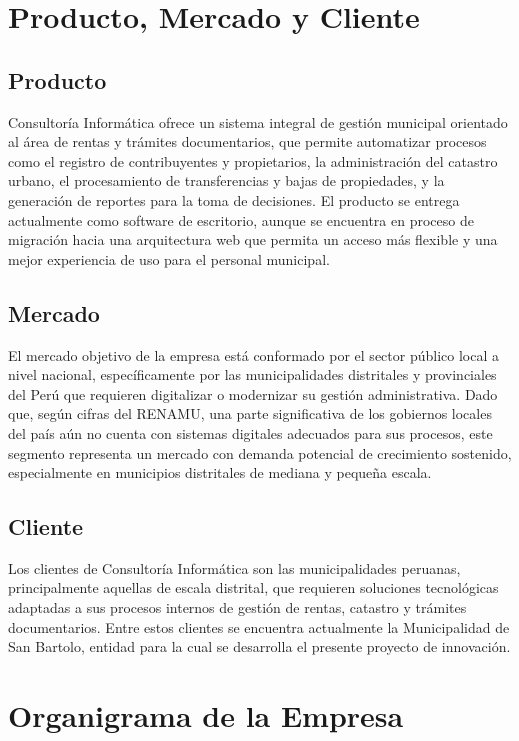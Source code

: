 \documentclass[12pt,a4paper]{report}
\begin{document}
\section{Producto, Mercado y Cliente}

\subsection{Producto}
Consultoría Informática ofrece un sistema integral de gestión municipal orientado al área de rentas y trámites documentarios, que permite automatizar procesos como el registro de contribuyentes y propietarios, la administración del catastro urbano, el procesamiento de transferencias y bajas de propiedades, y la generación de reportes para la toma de decisiones. El producto se entrega actualmente como software de escritorio, aunque se encuentra en proceso de migración hacia una arquitectura web que permita un acceso más flexible y una mejor experiencia de uso para el personal municipal.

\subsection{Mercado}
El mercado objetivo de la empresa está conformado por el sector público local a nivel nacional, específicamente por las municipalidades distritales y provinciales del Perú que requieren digitalizar o modernizar su gestión administrativa. Dado que, según cifras del RENAMU, una parte significativa de los gobiernos locales del país aún no cuenta con sistemas digitales adecuados para sus procesos, este segmento representa un mercado con demanda potencial de crecimiento sostenido, especialmente en municipios distritales de mediana y pequeña escala.

\subsection{Cliente}
Los clientes de Consultoría Informática son las municipalidades peruanas, principalmente aquellas de escala distrital, que requieren soluciones tecnológicas adaptadas a sus procesos internos de gestión de rentas, catastro y trámites documentarios. Entre estos clientes se encuentra actualmente la Municipalidad de San Bartolo, entidad para la cual se desarrolla el presente proyecto de innovación.

\section{Organigrama de la Empresa}
\end{document}
